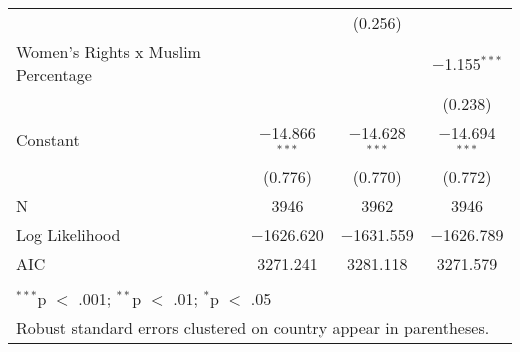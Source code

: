 \begin{table}[!htbp]
\begin{tabular}{@{\extracolsep{5pt}}lccc}
  &  & (0.256) &  \\ 
  Women's Rights x Muslim Percentage &  &  & $-$1.155$^{***}$ \\ 
  &  &  & (0.238) \\ 
  Constant & $-$14.866$^{***}$ & $-$14.628$^{***}$ & $-$14.694$^{***}$ \\ 
  & (0.776) & (0.770) & (0.772) \\ 
 N & 3946 & 3962 & 3946 \\ 
Log Likelihood & $-$1626.620 & $-$1631.559 & $-$1626.789 \\ 
AIC & 3271.241 & 3281.118 & 3271.579 \\ 
\hline \\[-1.8ex] 
\multicolumn{4}{l}{$^{***}$p $<$ .001; $^{**}$p $<$ .01; $^{*}$p $<$ .05} \\ 
\multicolumn{4}{l}{Robust standard errors clustered on country appear in parentheses.} \\ 
\end{tabular} 
\end{table} 
